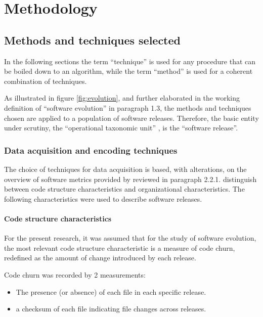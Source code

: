 
\chapter{Methodology} %

\label{Chapter3} %


\section{Methods and techniques selected}
In the following sections the term “technique” is used for any procedure that can be boiled down to an algorithm, while the term “method” is used for a coherent combination of techniques.

As illustrated in figure \ref{fig:evolution}, and further elaborated in the working definition of “software evolution” in paragraph 1.3, the methods and techniques chosen are applied to a population of software releases. Therefore, the basic entity under scrutiny, the “operational taxonomic unit” \citep{Sokal1986a}, is the “software release”.

\subsection{Data acquisition and encoding techniques}

The choice of techniques for data acquisition is based, with alterations, on the overview of software metrics provided by \citet{Nagappan2008a} reviewed in paragraph 2.2.1. \citet{Nagappan2008a} distinguish between code structure characteristics and organizational characteristics. The following characteristics were used to describe software releases.

\subsubsection{Code structure characteristics}
For the present research, it was assumed that for the study of software evolution, the most relevant code structure characteristic is a measure of code churn, redefined as the amount of change introduced by each release.

\noindent
Code churn was recorded by 2 measurements: 
\begin{itemize}
\item{The presence (or absence) of each file in each specific release.}
\item{a checksum of each file indicating file changes across releases.}
\end{itemize}

